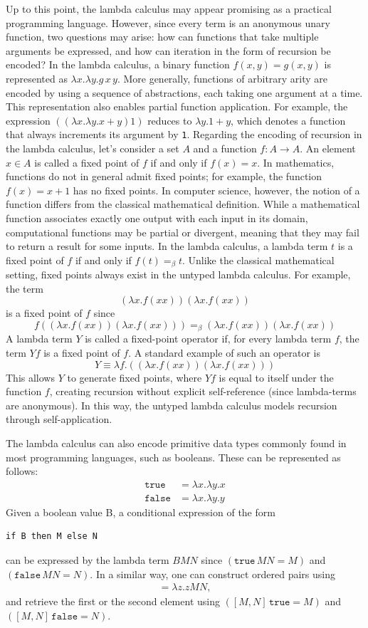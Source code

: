Up to this point, the lambda calculus may appear promising as a practical programming language. However, since every term is an anonymous unary function, two questions may arise: how can functions that take multiple arguments be expressed, and how can iteration in the form of recursion be encoded? In the lambda calculus, a binary function $f(x, y) = g(x, y)$ is represented as $\lambda x.\lambda y.g\,x\,y$. More generally, functions of arbitrary arity are encoded by using a sequence of abstractions, each taking one argument at a time. This representation also enables partial function application. For example, the expression $((\lambda x.\lambda y.x+y)1)$ reduces to $\lambda y.1+y$, which denotes a function that always increments its argument by \verb|1|. Regarding the encoding of recursion in the lambda calculus, let's consider a set \( A \) and a function \( f: A \to A \). An element \( x \in A \) is called a fixed point of \( f \) if and only if \( f(x) = x \). In mathematics, functions do not in general admit fixed points; for example, the function \( f(x) = x + 1 \) has no fixed points. In computer science, however, the notion of a function differs from the classical mathematical definition. While a mathematical function associates exactly one output with each input in its domain, computational functions may be partial or divergent, meaning that they may fail to return a result for some inputs. In the lambda calculus, a lambda term \(t\) is a fixed point of \(f\) if and only if \( f(t) =_\beta t \). Unlike the classical mathematical setting, fixed points always exist in the untyped lambda calculus. For example, the term 
\[ 
(\lambda x. f(xx)) (\lambda x. f(xx))
\] 
is a fixed point of \( f \) since 
\[ f((\lambda x. f(xx)) (\lambda x. f(xx)))=_\beta (\lambda x. f(xx)) (\lambda x. f(xx)) \]
A lambda term $Y$ is called a fixed-point operator if, for every lambda term $f$, the term $Yf$ is a fixed point of $f$. A standard example of such an operator is
\[ 
Y \equiv \lambda f.((\lambda x. f(xx)) (\lambda x. f(xx))) 
\]
This allows $Y$ to generate fixed points, where $Yf$ is equal to itself under the function $f$, creating recursion without explicit self-reference (since lambda-terms are anonymous). In this way, the untyped lambda calculus models recursion through self-application.

The lambda calculus can also encode primitive data types commonly found in most programming languages, such as booleans. These can be represented as follows:
\begin{align*}
\mathtt{true} &= \lambda x.\lambda y.x \\
\mathtt{false} &= \lambda x.\lambda y.y
\end{align*}
Given a boolean value B, a conditional expression of the form
\begin{verbatim}
if B then M else N
\end{verbatim}
can be expressed by the lambda term $BMN$ since $(\mathtt{true}\,MN=M)$ and $(\mathtt{false}\,MN=N)$.
In a similar way, one can construct ordered pairs using
\begin{align*}
    [M,N] = \lambda z.z MN,
\end{align*}
and retrieve the first or the second element using $([M,N]\,\mathtt{true}=M)$ and $([M,N]\,\mathtt{false}=N)$.

